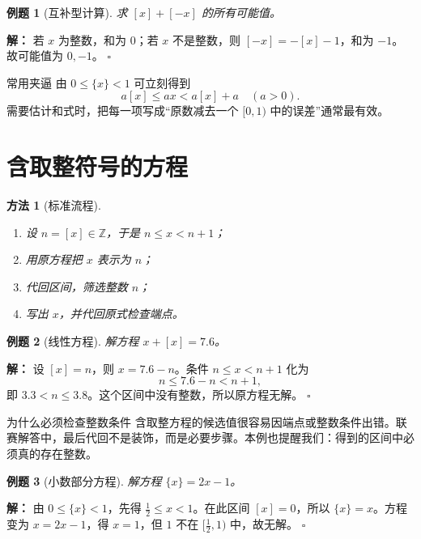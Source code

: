 \documentclass[11pt,a4paper,fontset=fandol]{ctexart}
\theoremstyle{formaltheorem}
\newtheorem{method}{方法}[section]
\theoremstyle{formalexample}
\newtheorem{example}{例题}[section]
\newenvironment{solution}{\par\noindent\textbf{解：}}{\hfill$\square$\par}
\begin{document}
\begin{example}[互补型计算]
求 $[x]+[-x]$ 的所有可能值。
\end{example}
\begin{solution}
若 $x$ 为整数，和为 $0$；若 $x$ 不是整数，则 $[-x]=-[x]-1$，和为 $-1$。故可能值为 $0,-1$。
\end{solution}

\begin{skillbox}{常用夹逼}
由 $0\le\{x\}<1$ 可立刻得到
\[
a[x]\le ax<a[x]+a\quad(a>0).
\]
需要估计和式时，把每一项写成“原数减去一个 $[0,1)$ 中的误差”通常最有效。
\end{skillbox}

\section{含取整符号的方程}
\begin{method}[标准流程]
\begin{enumerate}
  \item 设 $n=[x]\in\mathbb Z$，于是 $n\le x<n+1$；
  \item 用原方程把 $x$ 表示为 $n$；
  \item 代回区间，筛选整数 $n$；
  \item 写出 $x$，并代回原式检查端点。
\end{enumerate}
\end{method}

\begin{example}[线性方程]
解方程 $x+[x]=7.6$。
\end{example}
\begin{solution}
设 $[x]=n$，则 $x=7.6-n$。条件 $n\le x<n+1$ 化为
\[
n\le7.6-n<n+1,
\]
即 $3.3<n\le3.8$。这个区间中没有整数，所以原方程无解。
\end{solution}

\begin{notebox}{为什么必须检查整数条件}
含取整方程的候选值很容易因端点或整数条件出错。联赛解答中，最后代回不是装饰，而是必要步骤。本例也提醒我们：得到的区间中必须真的存在整数。
\end{notebox}

\begin{example}[小数部分方程]
解方程 $\{x\}=2x-1$。
\end{example}
\begin{solution}
由 $0\le\{x\}<1$，先得 $\tfrac12\le x<1$。在此区间 $[x]=0$，所以 $\{x\}=x$。方程变为 $x=2x-1$，得 $x=1$，但 $1$ 不在 $[\tfrac12,1)$ 中，故无解。
\end{solution}
\end{document}
